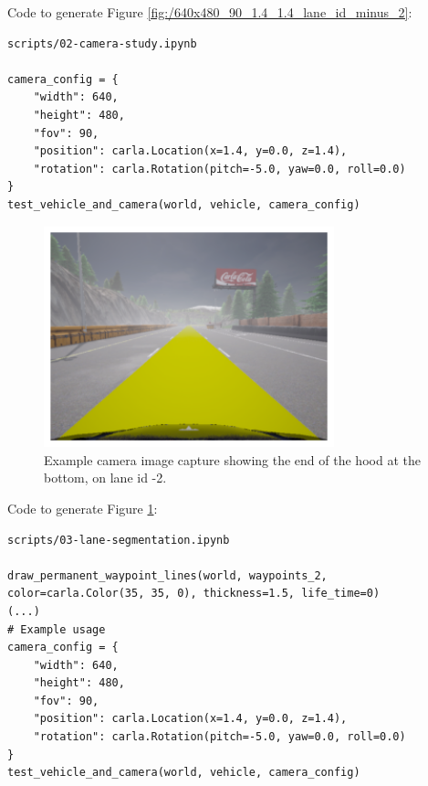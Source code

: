 Code to generate Figure \ref{fig:/640x480_90_1.4_1.4_lane_id_minus_2}:

\begin{verbatim}
scripts/02-camera-study.ipynb

camera_config = {
    "width": 640,
    "height": 480,
    "fov": 90,
    "position": carla.Location(x=1.4, y=0.0, z=1.4),
    "rotation": carla.Rotation(pitch=-5.0, yaw=0.0, roll=0.0)
}
test_vehicle_and_camera(world, vehicle, camera_config)

\end{verbatim}


\begin{figure}[h]
    \centering
    \includegraphics[width=0.75\textwidth]{Figures/Methods/640x480_90_1.4_1.4_lane_id_minus_2_segmented.png}
    \caption{Example camera image capture showing the end of the hood at the bottom, on lane id -2.}
    \label{fig:/640x480_90_1.4_1.4_lane_id_minus_2_segmented}
\end{figure}

Code to generate Figure \ref{fig:/640x480_90_1.4_1.4_lane_id_minus_2_segmented}:

\begin{verbatim}
scripts/03-lane-segmentation.ipynb

draw_permanent_waypoint_lines(world, waypoints_2, color=carla.Color(35, 35, 0), thickness=1.5, life_time=0)
(...)
# Example usage
camera_config = {
    "width": 640,
    "height": 480,
    "fov": 90,
    "position": carla.Location(x=1.4, y=0.0, z=1.4),
    "rotation": carla.Rotation(pitch=-5.0, yaw=0.0, roll=0.0)
}
test_vehicle_and_camera(world, vehicle, camera_config)
\end{verbatim}

